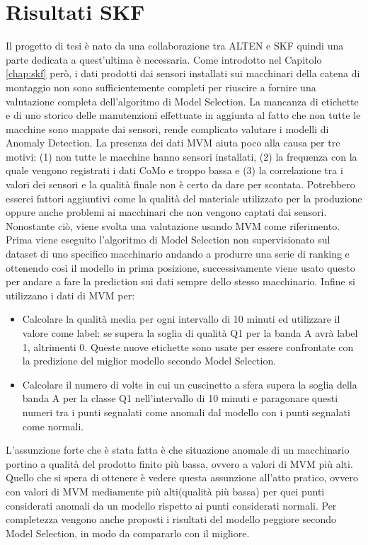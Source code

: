 \section{Risultati SKF}
Il progetto di tesi è nato da una collaborazione tra ALTEN e SKF quindi una parte dedicata a quest'ultima è necessaria. Come introdotto nel Capitolo \ref{chap:skf} però, i dati prodotti dai sensori installati sui macchinari della catena di montaggio non sono sufficientemente completi per riuscire a fornire una valutazione completa dell'algoritmo di Model Selection. La mancanza di etichette e di uno storico delle manutenzioni effettuate in aggiunta al fatto che non tutte le macchine sono mappate dai sensori, rende complicato valutare i modelli di Anomaly Detection. La presenza dei dati MVM aiuta poco alla causa per tre motivi: (1) non tutte le macchine hanno sensori installati, (2) la frequenza con la quale vengono registrati i dati CoMo e troppo bassa e (3) la correlazione tra i valori dei sensori e la qualità finale non è certo da dare per scontata. Potrebbero esserci fattori aggiuntivi come la qualità del materiale utilizzato per la produzione oppure anche problemi ai macchinari che non vengono captati dai sensori. 
Nonostante ciò, viene svolta una valutazione usando MVM come riferimento. Prima viene eseguito l'algoritmo di Model Selection non supervisionato sul dataset di uno specifico macchinario andando a produrre una serie di ranking e ottenendo così il modello in prima posizione, successivamente viene usato questo per andare a fare la prediction sui dati sempre dello stesso macchinario. Infine si utilizzano i dati di MVM per:
\begin{itemize}
        \item Calcolare la qualità media per ogni intervallo di 10 minuti ed utilizzare il valore come label: se supera la soglia di qualità Q1 per la banda A avrà label 1, altrimenti 0. Queste nuove etichette sono usate per essere confrontate con la predizione del miglior modello secondo Model Selection.
	\item Calcolare il numero di volte in cui un cuscinetto a sfera supera la soglia della banda A per la classe Q1 nell'intervallo di 10 minuti e paragonare questi numeri tra i punti segnalati come anomali dal modello con i punti segnalati come normali.
	
\end{itemize}
L'assunzione forte che è stata fatta è che situazione anomale di un macchinario portino a qualità del prodotto finito più bassa, ovvero a valori di MVM più alti. Quello che si spera di ottenere è vedere questa assunzione all'atto pratico, ovvero con valori di MVM mediamente più alti(qualità più bassa) per quei punti considerati anomali da un modello rispetto ai punti considerati normali.
Per completezza vengono anche proposti i risultati del modello peggiore secondo Model Selection, in modo da compararlo con il migliore.

